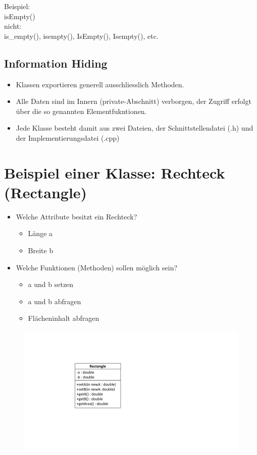 Beispiel:\\
\color{green}isEmpty()\color{black}\\
nicht:\\
\color{red}is\_empty(), isempty(), IsEmpty(), Isempty(), etc.\color{black}

\subsection{Information Hiding}
\label{sec:Information Hiding}
\begin{itemize}
	\item Klassen exportieren generell ausschliesslich Methoden.
	\item[\-] Alle Daten sind im Innern (private-Abschnitt) verborgen, der Zugriff erfolgt über die so genannten Elementfukntionen.
	\item Jede Klasse besteht damit aus zwei Dateien, der Schnittstellendatei (.h) und der Implementierungsdatei (.cpp)
\end{itemize}

\section{Beispiel einer Klasse: Rechteck (Rectangle)}
\label{sec:Beispiel einer Klasse: Rechteck}
\begin{itemize}
	\item Welche Attribute besitzt ein Rechteck?
	\begin{itemize}
		\item Länge a
		\item Breite b
	\end{itemize}
	\item Welche Funktionen (Methoden) sollen möglich sein?
	\begin{itemize}
		\item a und b setzen
		\item a und b abfragen
		\item Flächeninhalt abfragen
	\end{itemize}
\end{itemize}
\begin{figure}[hh]
	\centering
	\includegraphics[width=0.3\linewidth]{images/klasse4.pdf}
\end{figure}

